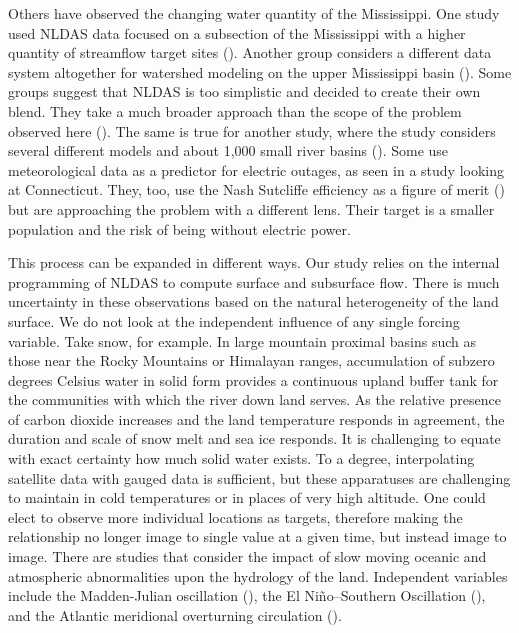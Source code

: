 \begin{refsection}
Others have observed the changing water quantity of the Mississippi. One study used NLDAS data focused on a subsection of the Mississippi with a higher quantity of streamflow target sites (\cite{qi2019use}). Another group considers a different data system altogether for watershed modeling on the upper Mississippi basin (\cite{chen2021effect}). Some groups suggest that NLDAS is too simplistic and decided to create their own blend. They take a much broader approach than the scope of the problem observed here (\cite{tran2022hydrological}). The same is true for another study, where the study considers several different models and about 1,000 small river basins (\cite{cai2014assessment}). Some use meteorological data as a predictor for electric outages, as seen in a study looking at Connecticut. They, too, use the Nash Sutcliffe efficiency as a figure of merit (\cite{yang2021effect}) but are approaching the problem with a different lens. Their target is a smaller population and the risk of being without electric power.

This process can be expanded in different ways. Our study relies on the internal programming of NLDAS to compute surface and subsurface flow. There is much uncertainty in these observations based on the natural heterogeneity of the land surface. We do not look at the independent influence of any single forcing variable. Take snow, for example. In large mountain proximal basins such as those near the Rocky Mountains or Himalayan ranges, accumulation of subzero degrees Celsius water in solid form provides a continuous upland buffer tank for the communities with which the river down land serves. As the relative presence of carbon dioxide increases and the land temperature responds in agreement, the duration and scale of snow melt and sea ice responds. It is challenging to equate with exact certainty how much solid water exists. To a degree, interpolating satellite data with gauged data is sufficient, but these apparatuses are challenging to maintain in cold temperatures or in places of very high altitude. One could elect to observe more individual locations as targets, therefore making the relationship no longer image to single value at a given time, but instead image to image. There are studies that consider the impact of slow moving oceanic and atmospheric abnormalities upon the hydrology of the land. Independent variables include the Madden-Julian oscillation (\cite{jiang2020fifty}), the El Niño–Southern Oscillation (\cite{hu2015pacific}), and the Atlantic meridional overturning circulation (\cite{ionita2022long}).


\end{refsection}
